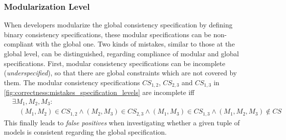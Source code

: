 \subsubsection{Modularization Level}
When developers modularize the global consistency specification by defining binary consistency specifications, these modular specifications can be non-compliant with the global one. 
Two kinds of mistakes, similar to those at the global level, can be distinguished, regarding compliance of modular and global specifications. %
First, modular consistency specifications can be incomplete (\emph{underspecified}), so that there are global constraints which are not covered by them. 
The modular consistency specifications $\mathit{CS}_{1,2}$, $\mathit{CS}_{2,3}$ and $\mathit{CS}_{1,3}$ in \autoref{fig:correctness:mistakes_specification_levels} are incomplete iff
\begin{align*}
    & \exists M_1, M_2, M_3 : \\
    & \hspace{1em} (M_1, M_2) \in \mathit{CS}_{1,2} \land (M_2, M_3) \in \mathit{CS}_{2,3} \land (M_1, M_3) \in \mathit{CS}_{1,3} \land (M_1, M_2, M_3) \not\in \mathit{CS}
\end{align*}
This finally leads to \emph{false positives} when investigating whether a given tuple of models is consistent regarding the global specification. %
